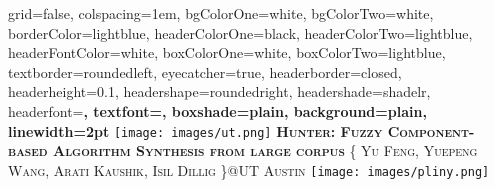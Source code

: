\documentclass[landscape,final,a0paper,fontscale=0.285]{baposter}
\begin{document}
\begin{poster}%
  {
  grid=false,
  colspacing=1em,
  bgColorOne=white,
  bgColorTwo=white,
  borderColor=lightblue,
  headerColorOne=black,
  headerColorTwo=lightblue,
  headerFontColor=white,
  boxColorOne=white,
  boxColorTwo=lightblue,
  textborder=roundedleft,
  eyecatcher=true,
  headerborder=closed,
  headerheight=0.1\textheight,
  headershape=roundedright,
  headershade=shadelr,
  headerfont=\Large\bf\textsc, %
  textfont={\setlength{\parindent}{1.5em}},
  boxshade=plain,
  background=plain,
  linewidth=2pt
  }
  {\texttt{[image: images/ut.png]}} 
  {\bf\textsc{Hunter: Fuzzy Component-based Algorithm Synthesis from large corpus}\vspace{0.1em}}
  {\textsc{\{ Yu Feng, Yuepeng Wang, Arati Kaushik, Isil Dillig \}@UT Austin}}
  {%
    \texttt{[image: images/pliny.png]}
  }

    \newcommand{\colouredcircle}{%
      \tikz{\useasboundingbox (-0.2em,-0.32em) rectangle(0.2em,0.32em); \draw[draw=black,fill=lightblue,line width=0.03em] (0,0) circle(0.18em);}}


\end{poster}
\end{document}
